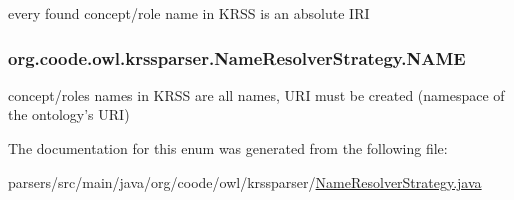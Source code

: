 every found concept/role name in K\-R\-S\-S is an absolute I\-R\-I \hypertarget{enumorg_1_1coode_1_1owl_1_1krssparser_1_1_name_resolver_strategy_a5630ecd737779e945ee8dacffa68d3ac}{
\subsubsection[{N\-A\-M\-E}]{\setlength{\rightskip}{0pt plus 5cm}org.\-coode.\-owl.\-krssparser.\-Name\-Resolver\-Strategy.\-N\-A\-M\-E}}\label{enumorg_1_1coode_1_1owl_1_1krssparser_1_1_name_resolver_strategy_a5630ecd737779e945ee8dacffa68d3ac}
concept/roles names in K\-R\-S\-S are all names, U\-R\-I must be created (namespace of the ontology's U\-R\-I) 

The documentation for this enum was generated from the following file\-:\begin{DoxyCompactItemize}
\item 
parsers/src/main/java/org/coode/owl/krssparser/\hyperlink{_name_resolver_strategy_8java}{Name\-Resolver\-Strategy.\-java}\end{DoxyCompactItemize}
